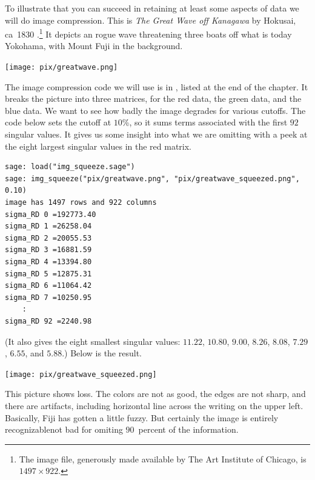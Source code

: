 To illustrate that you can succeed in retaining at least some aspects of data
we will do image compression.
This is \textit{The Great Wave off Kanagawa} by Hokusai, ca~1830
\cite{wiki:GreatWave}.\footnote{%
  The image file,
  generously made available by The Art Institute of Chicago, 
  is $1497\times 922$.}
It depicts an rogue wave threatening three boats off 
what is today Yokohama, with Mount Fuji in the background. 
\begin{center}
  \texttt{[image: pix/greatwave.png]} %
\end{center}

The image compression code we will use is in , 
listed at the end of the chapter.
It breaks the picture into three matrices, for the red data, the 
green data, and the blue data.
We want to see how badly the image degrades for various cutoffs.
The code below sets the cutoff at $10$\%,
so it sums terms associated
with the first $92$ singular values.
It gives us some insight into what we are omitting with  
a peek at the eight largest singular
values in the red matrix.
\begin{lstlisting}
sage: load("img_squeeze.sage")                                 
sage: img_squeeze("pix/greatwave.png", "pix/greatwave_squeezed.png", 0.10)
image has 1497 rows and 922 columns
sigma_RD 0 =192773.40
sigma_RD 1 =26258.04
sigma_RD 2 =20055.53
sigma_RD 3 =16881.59
sigma_RD 4 =13394.80
sigma_RD 5 =12875.31
sigma_RD 6 =11064.42
sigma_RD 7 =10250.95
    :
sigma_RD 92 =2240.98
\end{lstlisting}
(It also gives the eight smallest singular values:
  $11.22$,
  $10.80$,
  $9.00$,
  $8.26$,
  $8.08$,
  $7.29$,
  $6.55$, and
  $5.88$.)
Below is the result.
\begin{center}
  \texttt{[image: pix/greatwave\_squeezed.png]}
\end{center}
This picture shows loss.
The colors are not as good, the edges are not sharp, and there are 
artifacts, including horizontal line across the writing on the 
upper left.
Basically, Fiji has gotten a little fuzzy.
But certainly the image is entirely recognizable\Dash not bad for omiting
$90$~percent of the information.

